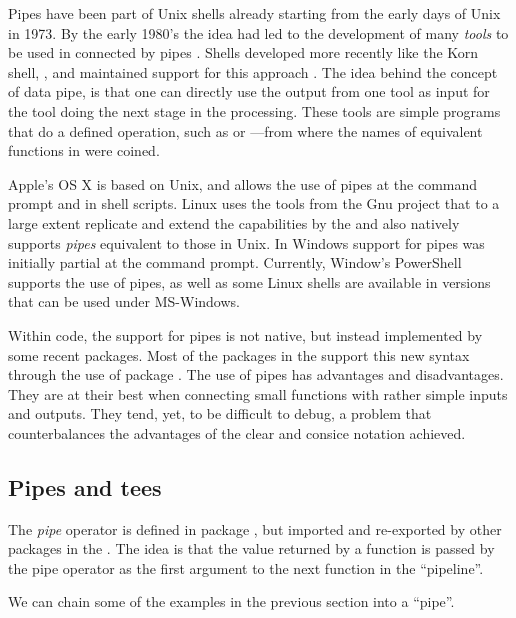 \documentclass[krantz2]{krantz}\usepackage{knitr}%
\begin{document}
Pipes have been part of Unix shells already starting from the early days of Unix in 1973. By the early 1980's the idea had led to the development of many \emph{tools} to be used in  connected by pipes \autocite{Kernigham1981}. Shells developed more recently like the Korn shell, , and  maintained support for this approach \autocite{Rosenblatt1993}. The idea behind the concept of data pipe, is that one can directly use the output from one tool as input for the tool doing the next stage in the processing. These tools are simple programs that do a defined operation, such as  or ---from where the names of equivalent functions in  were coined.

Apple's OS X is based on Unix, and allows the use of pipes at the command prompt and in shell scripts. Linux uses the tools from the Gnu project that to a large extent replicate and extend the capabilities  by the and also natively supports \emph{pipes} equivalent to those in Unix. In Windows support for pipes was initially partial at the command prompt. Currently, Window's PowerShell supports the use of pipes, as well as some Linux shells are available in versions that can be used under MS-Windows.

Within \Rlang code, the support for pipes is not native, but instead implemented by some recent packages. Most of the packages in the  support this new syntax through the use of package . The use of pipes has advantages and disadvantages. They are at their best when connecting small functions with rather simple inputs and outputs. They tend, yet, to be difficult to debug, a problem that counterbalances the advantages of the clear and consice notation achieved.

\subsection{Pipes and tees}

The \emph{pipe} operator \Roperator{\%>\%} is defined in package , but imported and re-exported by other packages in the . The idea is that the value returned by a function is passed by the pipe operator as the first argument to the next function in the ``pipeline''.

We can chain some of the examples in the previous section into a ``pipe''.
\end{document}
